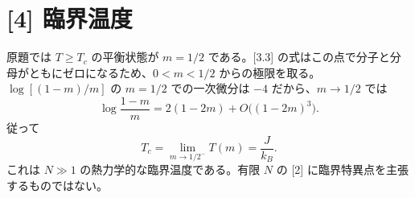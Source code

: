 \documentclass[11pt,a4paper]{article}
\begin{document}
\section*{[4] 臨界温度}
原題では $T\geq T_c$ の平衡状態が $m=1/2$ である。[3.3] の式はこの点で分子と分母がともにゼロになるため、$0<m<1/2$ からの極限を取る。$\log[(1-m)/m]$ の $m=1/2$ での一次微分は $-4$ だから、$m\to1/2$ では
\[
\log\frac{1-m}{m}=2(1-2m)+O\bigl((1-2m)^3\bigr).
\]
従って
\[
\boxed{T_c=\lim_{m\to1/2^-}T(m)=\frac{J}{k_B}.}
\]
これは $N\gg1$ の熱力学的な臨界温度である。有限 $N$ の [2] に臨界特異点を主張するものではない。
\end{document}
